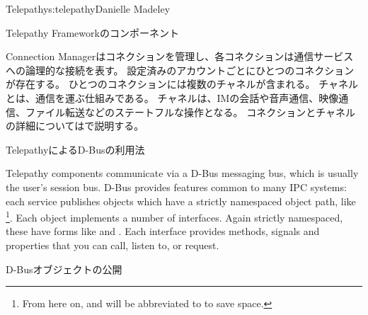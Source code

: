 \begin{aosachapter}{Telepathy}{s:telepathy}{Danielle Madeley}
\begin{aosasect1}{Telepathy Frameworkのコンポーネント}
\begin{aosadescription}
\end{aosadescription}

Connection Managerはコネクションを管理し、各コネクションは通信サービスへの論理的な接続を表す。
設定済みのアカウントごとにひとつのコネクションが存在する。
ひとつのコネクションには複数のチャネルが含まれる。
チャネルとは、通信を運ぶ仕組みである。
チャネルは、IMの会話や音声通信、映像通信、ファイル転送などのステートフルな操作となる。
コネクションとチャネルの詳細についてはで説明する。

\end{aosasect1}

\begin{aosasect1}{TelepathyによるD-Busの利用法}

Telepathy components communicate via a D-Bus messaging bus, which is
usually the user's session bus.  D-Bus provides features common to
many IPC systems: each service publishes objects which have
a strictly namespaced object path, like
\footnote{From here
on,  and
 will be abbreviated to 
to save space.}.  Each object implements a number of
interfaces. Again strictly namespaced, these have forms like
 and .
Each interface provides methods, signals and properties that you can
call, listen to, or request.


\begin{aosabox}{D-Busオブジェクトの公開}


\end{aosabox}
\end{aosasect1}
\end{aosachapter}
